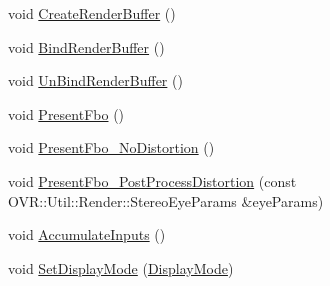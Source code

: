 \begin{DoxyCompactItemize}
void \hyperlink{class_b_g_e_1_1_rift_controller_a3d34b49b1d851fdd373c31a68ccad5e8}{Create\-Render\-Buffer} ()
\item 
void \hyperlink{class_b_g_e_1_1_rift_controller_ab28a3401a8255753b4fff4b6a5be3335}{Bind\-Render\-Buffer} ()
\item 
void \hyperlink{class_b_g_e_1_1_rift_controller_ac509f04c05c436f0723ebff7cce364a6}{Un\-Bind\-Render\-Buffer} ()
\item 
void \hyperlink{class_b_g_e_1_1_rift_controller_ad37a71e260ef673889b019668ae99145}{Present\-Fbo} ()
\item 
void \hyperlink{class_b_g_e_1_1_rift_controller_a4942cb092ba4baef4aa6c17ed99d1a71}{Present\-Fbo\-\_\-\-No\-Distortion} ()
\item 
void \hyperlink{class_b_g_e_1_1_rift_controller_ac99fd67e360b2f6c41726db899ee71d9}{Present\-Fbo\-\_\-\-Post\-Process\-Distortion} (const O\-V\-R\-::\-Util\-::\-Render\-::\-Stereo\-Eye\-Params \&eye\-Params)
\item 
void \hyperlink{class_b_g_e_1_1_rift_controller_a0728bd282bb2f3529cc90eb6aab28875}{Accumulate\-Inputs} ()
\item 
void \hyperlink{class_b_g_e_1_1_rift_controller_ae43b23c58333f5e49f97967278fb7751}{Set\-Display\-Mode} (\hyperlink{class_b_g_e_1_1_rift_controller_aa838447581190009976c2fb8cde1735a}{Display\-Mode})
\end{DoxyCompactItemize}
